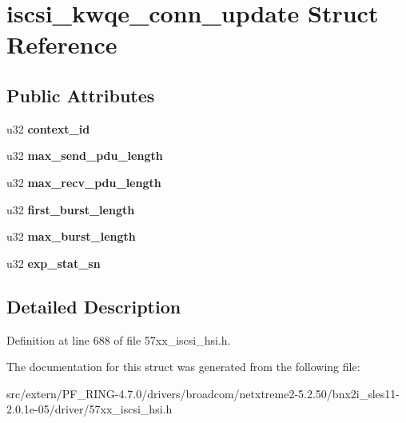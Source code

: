 \hypertarget{structiscsi__kwqe__conn__update}{
\section{iscsi\_\-kwqe\_\-conn\_\-update Struct Reference}
\label{structiscsi__kwqe__conn__update}
}
\subsection*{Public Attributes}
\begin{DoxyCompactItemize}
\item 
\hypertarget{structiscsi__kwqe__conn__update_ab306931c657eadb510471c1539af31a3}{
u32 {\bfseries context\_\-id}}
\label{structiscsi__kwqe__conn__update_ab306931c657eadb510471c1539af31a3}

\item 
\hypertarget{structiscsi__kwqe__conn__update_af331a9d359303d3e7603c5df9926eb89}{
u32 {\bfseries max\_\-send\_\-pdu\_\-length}}
\label{structiscsi__kwqe__conn__update_af331a9d359303d3e7603c5df9926eb89}

\item 
\hypertarget{structiscsi__kwqe__conn__update_a556d261276a47dd0ba91acce40fc4108}{
u32 {\bfseries max\_\-recv\_\-pdu\_\-length}}
\label{structiscsi__kwqe__conn__update_a556d261276a47dd0ba91acce40fc4108}

\item 
\hypertarget{structiscsi__kwqe__conn__update_a41f0aeb084a468ecd0e6417250e287a6}{
u32 {\bfseries first\_\-burst\_\-length}}
\label{structiscsi__kwqe__conn__update_a41f0aeb084a468ecd0e6417250e287a6}

\item 
\hypertarget{structiscsi__kwqe__conn__update_a4d558ebf5951ab5399770df9e5b10acc}{
u32 {\bfseries max\_\-burst\_\-length}}
\label{structiscsi__kwqe__conn__update_a4d558ebf5951ab5399770df9e5b10acc}

\item 
\hypertarget{structiscsi__kwqe__conn__update_a5305b294dc9aa77bbf535d6469cd7507}{
u32 {\bfseries exp\_\-stat\_\-sn}}
\label{structiscsi__kwqe__conn__update_a5305b294dc9aa77bbf535d6469cd7507}

\end{DoxyCompactItemize}


\subsection{Detailed Description}


Definition at line 688 of file 57xx\_\-iscsi\_\-hsi.h.



The documentation for this struct was generated from the following file:\begin{DoxyCompactItemize}
\item 
src/extern/PF\_\-RING-\/4.7.0/drivers/broadcom/netxtreme2-\/5.2.50/bnx2i\_\-sles11-\/2.0.1e-\/05/driver/57xx\_\-iscsi\_\-hsi.h\end{DoxyCompactItemize}
